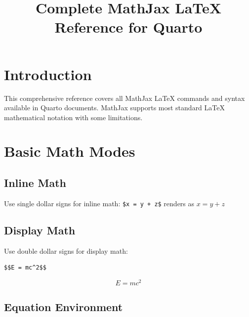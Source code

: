 \documentclass[
  letterpaper,
  DIV=11,
  numbers=noendperiod]{scrartcl}
\title{Complete MathJax LaTeX Reference for Quarto}
\author{}
\date{}
\renewcommand*\contentsname{Table of contents}
\newcommand\contentsname{Table of contents}
\begin{document}
\maketitle
\ifdefined\Shaded\renewenvironment{Shaded}{\begin{tcolorbox}[borderline west={3pt}{0pt}{shadecolor}, sharp corners, interior hidden, boxrule=0pt, breakable, enhanced, frame hidden]}{\end{tcolorbox}}\fi

\renewcommand*\contentsname{Table of contents}
{
\hypersetup{linkcolor=}
\setcounter{tocdepth}{3}
\tableofcontents
}
\hypertarget{introduction}{%
\section{Introduction}\label{introduction}}

This comprehensive reference covers all MathJax LaTeX commands and
syntax available in Quarto documents. MathJax supports most standard
LaTeX mathematical notation with some limitations.

\hypertarget{basic-math-modes}{%
\section{Basic Math Modes}\label{basic-math-modes}}

\hypertarget{inline-math}{%
\subsection{Inline Math}\label{inline-math}}

Use single dollar signs for inline math: \texttt{\$x\ =\ y\ +\ z\$}
renders as \(x = y + z\)

\hypertarget{display-math}{%
\subsection{Display Math}\label{display-math}}

Use double dollar signs for display math:

\begin{verbatim}
$$E = mc^2$$
\end{verbatim}

\[E = mc^2\]

\hypertarget{equation-environment}{%
\subsection{Equation Environment}\label{equation-environment}}
\end{document}
